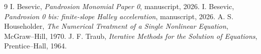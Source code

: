 \documentclass[11pt]{article}
\begin{document}
\begin{thebibliography}{9}
 I. Besevic, \emph{Pandrosion Monomial Paper 0}, manuscript, 2026.
 I. Besevic, \emph{Pandrosion 0 bis: finite-slope Halley acceleration}, manuscript, 2026.
 A. S. Householder, \emph{The Numerical Treatment of a Single Nonlinear Equation}, McGraw--Hill, 1970.
 J. F. Traub, \emph{Iterative Methods for the Solution of Equations}, Prentice--Hall, 1964.

\end{thebibliography}
\end{document}
